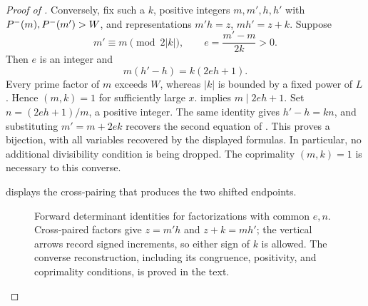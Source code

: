 \begin{proof}[Proof of ]
Conversely, fix such a $k$, positive integers $m,m',h,h'$ with
$P^{-}(m),P^{-}(m')>W$, and representations
$m'h=z$, $mh'=z+k$. Suppose
\[
 m'\equiv m\pmod{2|k|},\qquad
                 e=\frac{m'-m}{2k}>0.
\]
Then $e$ is an integer and
\begin{equation}\label{eq:typeii-converse-identity}
                   m(h'-h)=k(2eh+1).
\end{equation}
Every prime factor of $m$ exceeds $W$, whereas $|k|$ is bounded by
a fixed power of $L$. Hence $(m,k)=1$ for sufficiently large $x$.
 implies $m\mid2eh+1$.
Set $n=(2eh+1)/m$, a positive integer. The same identity gives
$h'-h=kn$, and substituting $m'=m+2ek$ recovers the second equation
of . This proves a bijection, with all
variables recovered by the displayed formulas. In particular, no
additional divisibility condition is being dropped. The coprimality
$(m,k)=1$ is necessary to this converse.

 displays the cross-pairing that produces the
two shifted endpoints.
\begin{figure}[htbp]
\centering
{}
\caption{Forward determinant identities for factorizations with common
$e,n$. Cross-paired factors give $z=m'h$ and $z+k=mh'$; the vertical
arrows record signed increments, so either sign of $k$ is allowed.
The converse reconstruction, including its congruence, positivity,
and coprimality conditions, is proved in the text.}
\label{fig:determinant}
\end{figure}


\end{proof}

